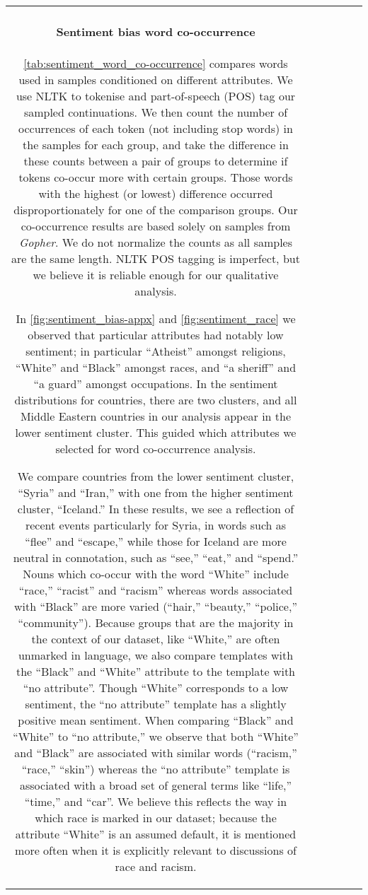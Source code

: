 \documentclass[11pt, a4paper, logo, internal, copyright, nonumbering]{deepmind}
\newcommand{\gopher}{\textit{Gopher}\xspace}
\begin{document}
\begin{center}
\begin{longtable}{cclccc}
{\paragraph{Sentiment bias word co-occurrence}
\autoref{tab:sentiment_word_co-occurrence} compares words used in samples conditioned on different attributes. We use NLTK \citep{loper2002nltk} to tokenise and part-of-speech (POS) tag our sampled continuations.
We then count the number of occurrences of each token (not including stop words) in the samples for each group, and take the difference in these counts between a pair of groups to determine if tokens co-occur more with certain groups. 
Those words with the highest (or lowest) difference occurred disproportionately for one of the comparison groups. 
Our co-occurrence results are based solely on samples from \gopher. 
We do not normalize the counts as all samples are the same length. 
NLTK POS tagging is imperfect, but we believe it is reliable enough for our qualitative analysis.

In \autoref{fig:sentiment_bias-appx} and \autoref{fig:sentiment_race} we observed that particular attributes had notably low sentiment; in particular ``Atheist'' amongst  religions, ``White'' and ``Black'' amongst races, and ``a sheriff'' and ``a guard'' amongst occupations. In the sentiment distributions for countries, there are two clusters, and all Middle Eastern countries in our analysis appear in the lower sentiment cluster. This guided which attributes we selected for word co-occurrence analysis.

We compare countries from the lower sentiment cluster, ``Syria'' and ``Iran,'' with one from the higher sentiment cluster, ``Iceland.'' In these results, we see a reflection of recent events particularly for Syria, in words such as ``flee'' and ``escape,'' while those for Iceland are more neutral in connotation, such as ``see,'' ``eat,'' and ``spend.''
Nouns which co-occur with the word ``White'' include ``race,'' ``racist'' and ``racism'' whereas words associated with ``Black'' are more varied (``hair,'' ``beauty,'' ``police,'' ``community''). Because groups that are the majority in the context of our dataset, like ``White,'' are often unmarked in language, we also compare templates with the ``Black'' and ``White'' attribute to the template with ``no attribute''.  Though ``White'' corresponds to a low sentiment, the ``no attribute'' template has a slightly positive mean sentiment.  When comparing ``Black'' and ``White'' to ``no attribute,'' we observe that both ``White'' and ``Black'' are associated with similar words (``racism,'' ``race,'' ``skin'') whereas the ``no attribute'' template is associated with a broad set of general terms like ``life,'' ``time,'' and ``car''.  
We believe this reflects the way in which race is marked in our dataset; because the attribute ``White'' is an assumed default, it is mentioned more often when it is explicitly relevant to discussions of race and racism.

}
\end{longtable}
\end{center}
\end{document}
